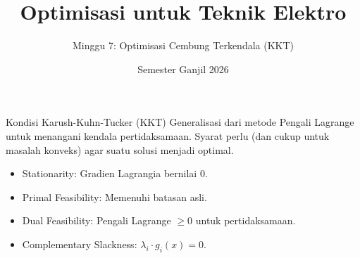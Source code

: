 \documentclass[aspectratio=169]{beamer}
\title{Optimisasi untuk Teknik Elektro}\subtitle{Minggu 7: Optimisasi Cembung Terkendala (KKT)}
\date{Semester Ganjil 2026}
\begin{document}
\begin{frame}\titlepage\end{frame}
\begin{frame}{Kondisi Karush-Kuhn-Tucker (KKT)}
Generalisasi dari metode Pengali Lagrange untuk menangani kendala pertidaksamaan.
Syarat perlu (dan cukup untuk masalah konveks) agar suatu solusi menjadi optimal.
\begin{itemize}
\item Stationarity: Gradien Lagrangia bernilai 0.
\item Primal Feasibility: Memenuhi batasan asli.
\item Dual Feasibility: Pengali Lagrange $\ge 0$ untuk pertidaksamaan.
\item Complementary Slackness: $\lambda_i \cdot g_i(x) = 0$.
\end{itemize}
\end{frame}
\end{document}
